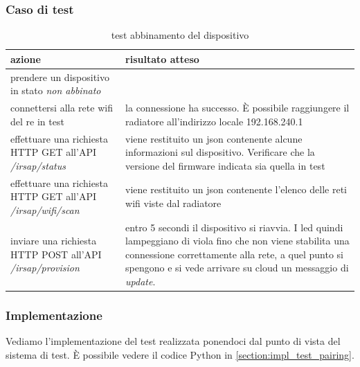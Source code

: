 \documentclass[12pt,a4paper,twoside,titlepage]{book}
\begin{document}
\subsubsection{Caso di test}

\begin{table}
    \centering
    \begin{tabular}{| p{} | p{} |}
        \hline 
        \textbf{azione} & \textbf{risultato atteso} \\ \hline
        prendere un dispositivo in stato \textit{non abbinato} & \\ \hline
        connettersi alla rete \Gls{wifi} del \Gls{re} in test & la connessione ha successo. È possibile raggiungere il radiatore all'indirizzo locale 192.168.240.1 \\ \hline
        effettuare una richiesta HTTP GET all'API \textit{/irsap/status} & viene restituito un \acrshort{json} contenente alcune informazioni sul dispositivo. Verificare che la versione del \gls{firmware} indicata sia quella in test \\ \hline
        effettuare una richiesta HTTP GET all'API \textit{/irsap/wifi/scan} & viene restituito un \acrshort{json} contenente l'elenco delle reti \Gls{wifi} viste dal radiatore \\ \hline
        inviare una richiesta HTTP POST all'API \textit{/irsap/provision} & entro 5 secondi il dispositivo si riavvia. I led quindi lampeggiano di viola fino che non viene stabilita una connessione correttamente alla rete, a quel punto si spengono e si vede arrivare su cloud un messaggio di \textit{update}. \\ \hline
    \end{tabular}
    \caption{test abbinamento del dispositivo}
\end{table}

\subsubsection{Implementazione}

Vediamo l'implementazione del test realizzata ponendoci dal punto di vista del sistema di test. 
È possibile vedere il codice Python in \autoref{section:impl_test_pairing}.
\end{document}
